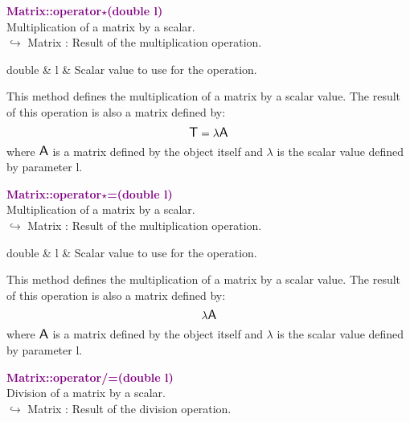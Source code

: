 \textcolor{purple}{\textbf{Matrix::operator$\star$(double l)}}\label{Matrix::operator*(double l)}\\
Multiplication of a matrix by a scalar.\\ \hspace*{10mm}$\hookrightarrow$ Matrix : Result of the multiplication operation.

\begin{tcolorbox}[width=\textwidth,myArgs,tabularx={ll|R}]
double & l & Scalar value to use for the operation.
\end{tcolorbox}

This method defines the multiplication of a matrix by a scalar value.
The result of this operation is also a matrix defined by:
\begin{equation*}
\mbox{\large\ensuremath{\mathsf{T}}} = \lambda \mbox{\large\ensuremath{\mathsf{A}}}
\end{equation*}
where $\mbox{\large\ensuremath{\mathsf{A}}}$ is a matrix defined by the object itself and $\lambda$ is the scalar value defined by parameter l.

\textcolor{purple}{\textbf{Matrix::operator$\star$=(double l)}}\label{Matrix::operator*=(double l)}\\
Multiplication of a matrix by a scalar.\\ \hspace*{10mm}$\hookrightarrow$ Matrix : Result of the multiplication operation.

\begin{tcolorbox}[width=\textwidth,myArgs,tabularx={ll|R}]
double & l & Scalar value to use for the operation.
\end{tcolorbox}

This method defines the multiplication of a matrix by a scalar value.
The result of this operation is also a matrix defined by:
\begin{equation*}
\lambda \mbox{\large\ensuremath{\mathsf{A}}}
\end{equation*}
where $\mbox{\large\ensuremath{\mathsf{A}}}$ is a matrix defined by the object itself and $\lambda$ is the scalar value defined by parameter l.

\textcolor{purple}{\textbf{Matrix::operator/=(double l)}}\label{Matrix::operator/=(double l)}\\
Division of a matrix by a scalar.\\ \hspace*{10mm}$\hookrightarrow$ Matrix : Result of the division operation.

